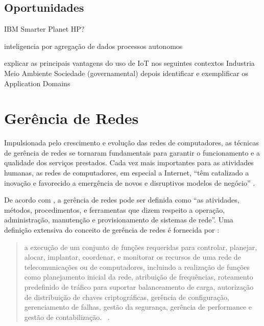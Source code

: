 \documentclass[twoside,english,brazilian]{UNISINOSmonografia}
\begin{document}
\subsection{Oportunidades}

IBM Smarter Planet
HP?

inteligencia por agregação de dados
processos autonomos

explicar as principais vantagens do uso de IoT nos seguintes contextos
Industria
Meio Ambiente
Sociedade (governamental)
depois identificar e exemplificar os Application Domains \cite{Sundmaeker2010}


\section{Gerência de Redes}

	Impulsionada pelo crescimento e evolução das redes de computadores, as 
	técnicas de gerência de redes se tornaram fundamentais para garantir o 
	funcionamento e a qualidade dos serviços prestados. Cada vez mais 
	importantes para as atividades humanas, as redes de computadores, em 
	especial a Internet, ``têm catalizado a inovação e favorecido a emergência 
	de novos e disruptivos modelos de negócio'' \cite{Ding2009}.
	
	De acordo com , a gerência de redes pode ser definida 
	como ``as atividades, métodos, procedimentos, e ferramentas que dizem 
	respeito a operação, administração, manutenção e provisionamento de 
	sistemas de rede''. Uma definição extensiva do conceito de gerência de 
	redes é fornecida por :
	
	\begin{quotation}
		a execução de um conjunto de funções requeridas para controlar, 
		planejar, alocar, implantar, coordenar, e monitorar os recursos de uma 
		rede de telecomunicações ou de computadores, incluindo a realização de 
		funções como planejamento inicial da rede, atribuição de frequências, 
		roteamento predefinido de tráfico para suportar balanceamento de 
		carga, autorização de distribuição de chaves criptográficas, gerência 
		de configuração, gerenciamento de falhas, gestão da segurança, 
		gerência de performance e gestão de contabilização.~
		\cite[p.~64]{Ding2009}.
	\end{quotation}
\end{document}
